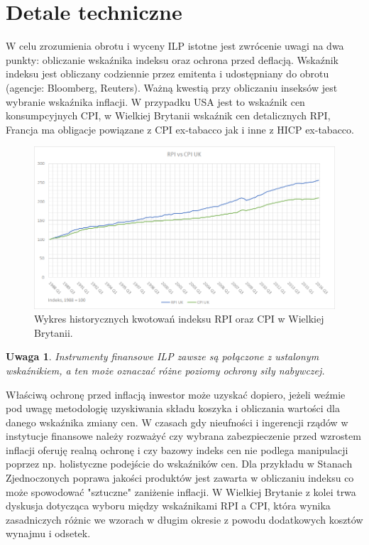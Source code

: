 \documentclass{mini}
\theoremstyle{mythstyle}
\newtheorem{Uwaga}{Uwaga}[chapter]
\begin{document}
	\section{Detale techniczne}
	W celu zrozumienia obrotu i wyceny ILP istotne jest zwrócenie uwagi na dwa punkty: obliczanie wskaźnika indeksu oraz ochrona przed deflacją. Wskaźnik indeksu jest obliczany codziennie przez emitenta i udostępniany do obrotu (agencje: Bloomberg, Reuters). Ważną kwestią przy obliczaniu inseksów jest wybranie wskaźnika inflacji. W przypadku USA jest to wskaźnik cen konsumpcyjnych CPI, w Wielkiej Brytanii wskaźnik cen detalicznych RPI, Francja ma obligacje powiązane z CPI ex-tabacco jak i inne z HICP ex-tabacco. \\
		\begin{figure} [!h]
		\centering
		\includegraphics[scale=0.65]{graphics/rpivscpi.png}
		\caption{Wykres historycznych kwotowań indeksu RPI oraz CPI w Wielkiej Brytanii.}
	\end{figure}
	\begin{Uwaga}
			Instrumenty finansowe ILP zawsze są połączone z ustalonym wskaźnikiem, a ten może oznaczać różne poziomy ochrony siły nabywczej. 
	\end{Uwaga}
	Właściwą ochronę przed inflacją inwestor może uzyskać dopiero, jeżeli weźmie pod uwagę metodologię uzyskiwania składu koszyka i obliczania wartości dla danego wskaźnika zmiany cen. W czasach gdy nieufności i ingerencji rządów w instytucje finansowe należy rozważyć czy wybrana zabezpieczenie przed wzrostem inflacji oferuję realną ochronę i czy bazowy indeks cen nie podlega manipulacji poprzez np. holistyczne podejście do wskaźników cen. Dla przykładu w Stanach Zjednoczonych poprawa jakości produktów jest zawarta w obliczaniu indeksu co może spowodować "sztuczne" zaniżenie inflacji. W Wielkiej Brytanie z kolei trwa dyskusja dotycząca wyboru między wskaźnikami RPI a CPI, która wynika zasadniczych różnic we wzorach w długim okresie z powodu dodatkowych kosztów wynajmu i odsetek. \\ 
\end{document}

